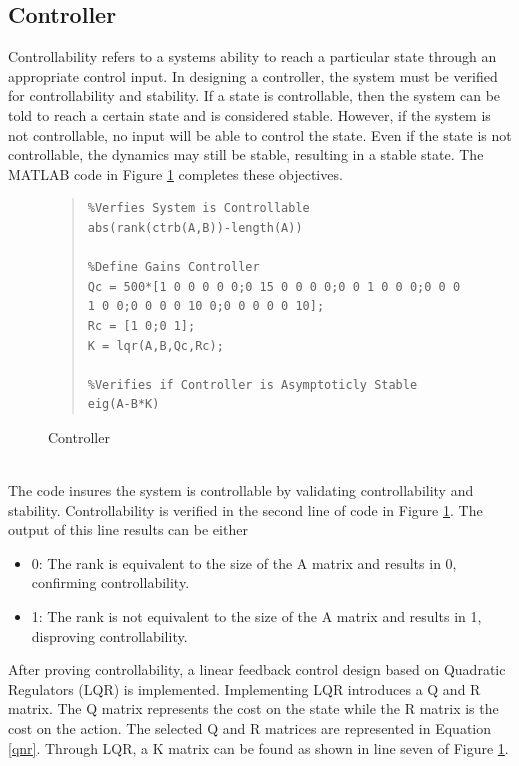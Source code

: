 \documentclass[12pt]{article}
\begin{document}
\subsection{Controller}
Controllability refers to a systems ability to reach a particular state through an appropriate control input. In designing a controller, the system must be verified for controllability and stability. If a state is controllable, then the system can be told to reach a certain state and is considered stable. However, if the system is not controllable, no input will be able to control the state. Even if the state is not controllable, the dynamics may still be stable, resulting in a stable state. The MATLAB code in Figure \ref{fig:cont} completes these objectives.
\begin{figure}[!h]
\begin{quote}
\begin{lstlisting}
%Verfies System is Controllable
abs(rank(ctrb(A,B))-length(A))

%Define Gains Controller
Qc = 500*[1 0 0 0 0 0;0 15 0 0 0 0;0 0 1 0 0 0;0 0 0 1 0 0;0 0 0 0 10 0;0 0 0 0 0 10];
Rc = [1 0;0 1];
K = lqr(A,B,Qc,Rc);

%Verifies if Controller is Asymptoticly Stable
eig(A-B*K)
\end{lstlisting}
\end{quote}
\caption{Controller\label{fig:cont}}
\end{figure}
\\
The code insures the system is controllable by validating controllability and stability. Controllability is verified in the second line of code in Figure \ref{fig:cont}. The output of this line results can be either
\begin{itemize}
\item 0: The rank is equivalent to the size of the A matrix and results in 0, confirming controllability.
\item 1: The rank is not equivalent to the size of the A matrix and results in 1, disproving controllability. 
\end{itemize}
After proving controllability, a linear feedback control design based on Quadratic Regulators (LQR) is implemented. Implementing LQR introduces a Q and R matrix. The Q matrix represents the cost on the state while the R matrix is the cost on the action. The selected Q and R matrices are represented in Equation \eqref{qnr}. Through LQR, a K matrix can be found as shown in line seven of Figure \ref{fig:cont}.
\\ \\
\end{document}
